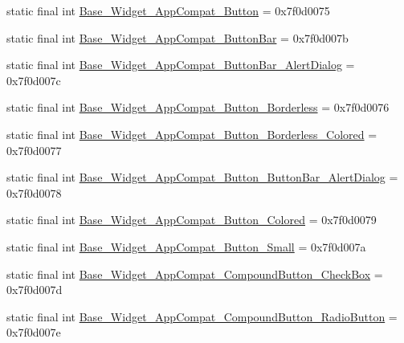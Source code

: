 \begin{DoxyCompactItemize}
static final int \mbox{\hyperlink{classandroid_1_1support_1_1v7_1_1appcompat_1_1_r_1_1style_a44c66034ef099053a9495dc74b620071}{Base\+\_\+\+Widget\+\_\+\+App\+Compat\+\_\+\+Button}} = 0x7f0d0075
\item 
static final int \mbox{\hyperlink{classandroid_1_1support_1_1v7_1_1appcompat_1_1_r_1_1style_adf27232a09e51af3ff01d1354d92428b}{Base\+\_\+\+Widget\+\_\+\+App\+Compat\+\_\+\+Button\+Bar}} = 0x7f0d007b
\item 
static final int \mbox{\hyperlink{classandroid_1_1support_1_1v7_1_1appcompat_1_1_r_1_1style_a4cb110246229736e0218fa2daada9617}{Base\+\_\+\+Widget\+\_\+\+App\+Compat\+\_\+\+Button\+Bar\+\_\+\+Alert\+Dialog}} = 0x7f0d007c
\item 
static final int \mbox{\hyperlink{classandroid_1_1support_1_1v7_1_1appcompat_1_1_r_1_1style_a7a9571105f3d848f8fa36375eb207033}{Base\+\_\+\+Widget\+\_\+\+App\+Compat\+\_\+\+Button\+\_\+\+Borderless}} = 0x7f0d0076
\item 
static final int \mbox{\hyperlink{classandroid_1_1support_1_1v7_1_1appcompat_1_1_r_1_1style_a3cbad8f9ee80cc10c4bacbc0f8d6bff9}{Base\+\_\+\+Widget\+\_\+\+App\+Compat\+\_\+\+Button\+\_\+\+Borderless\+\_\+\+Colored}} = 0x7f0d0077
\item 
static final int \mbox{\hyperlink{classandroid_1_1support_1_1v7_1_1appcompat_1_1_r_1_1style_a9fd13b4ad3ed54dbd97ebcde3b83adb1}{Base\+\_\+\+Widget\+\_\+\+App\+Compat\+\_\+\+Button\+\_\+\+Button\+Bar\+\_\+\+Alert\+Dialog}} = 0x7f0d0078
\item 
static final int \mbox{\hyperlink{classandroid_1_1support_1_1v7_1_1appcompat_1_1_r_1_1style_ab8551a77e3c16b43a85d6159629087f6}{Base\+\_\+\+Widget\+\_\+\+App\+Compat\+\_\+\+Button\+\_\+\+Colored}} = 0x7f0d0079
\item 
static final int \mbox{\hyperlink{classandroid_1_1support_1_1v7_1_1appcompat_1_1_r_1_1style_ae4b8bf3e528f1e685afe9dba173071ea}{Base\+\_\+\+Widget\+\_\+\+App\+Compat\+\_\+\+Button\+\_\+\+Small}} = 0x7f0d007a
\item 
static final int \mbox{\hyperlink{classandroid_1_1support_1_1v7_1_1appcompat_1_1_r_1_1style_a73ef775f81633470d8a108c06b0e4274}{Base\+\_\+\+Widget\+\_\+\+App\+Compat\+\_\+\+Compound\+Button\+\_\+\+Check\+Box}} = 0x7f0d007d
\item 
static final int \mbox{\hyperlink{classandroid_1_1support_1_1v7_1_1appcompat_1_1_r_1_1style_acbae6d6c74db639172d499065f47cb55}{Base\+\_\+\+Widget\+\_\+\+App\+Compat\+\_\+\+Compound\+Button\+\_\+\+Radio\+Button}} = 0x7f0d007e
\item 

\end{DoxyCompactItemize}
